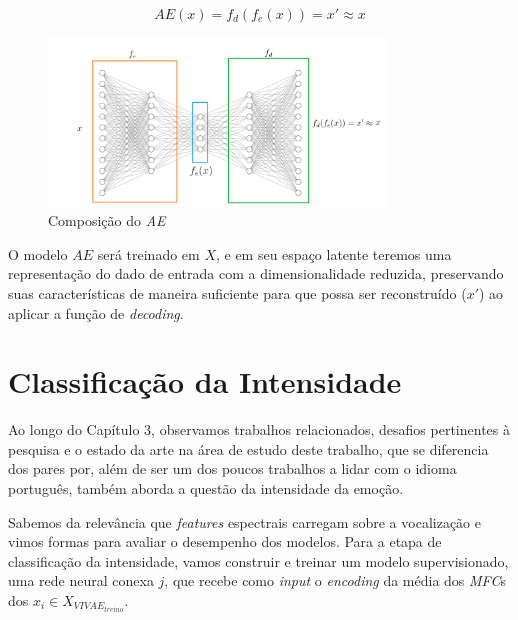 \begin{equation}
    AE(x) = f_d(f_e(x)) = x' \approx x
\end{equation}

\begin{figure}[]
    \centering
    \includegraphics[width=0.8\textwidth]{img/p-autoencoder.png}
    \caption{\label{fig:composicaoae}Composição do \textit{AE}}
\end{figure}

O modelo $AE$ será treinado em $X$, e em seu espaço latente teremos uma representação do dado de entrada com a dimensionalidade reduzida, preservando suas características de maneira suficiente para que possa ser reconstruído ($x'$) ao aplicar a função de \textit{decoding}.

\section{Classificação da Intensidade}


Ao longo do Capítulo 3, observamos trabalhos relacionados, desafios pertinentes à pesquisa e o estado da arte na área de estudo deste trabalho, que se diferencia dos pares por, além de ser um dos poucos trabalhos a lidar com o idioma português, também aborda a questão da intensidade da emoção.

Sabemos da relevância que \textit{features} espectrais carregam sobre a vocalização e vimos formas para avaliar o desempenho dos modelos. Para a etapa de classificação da intensidade, vamos construir e treinar um modelo supervisionado, uma rede neural conexa $j$, que recebe como \textit{input} o \textit{encoding} da média dos \textit{MFC}s dos $x_i \in X_{VIVAE_{treino}}$.

